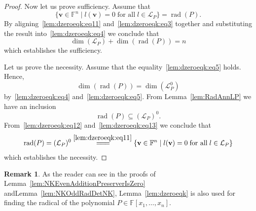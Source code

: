 \documentclass{elsarticle}
\DeclareMathOperator{\rad}{rad}
\def\F{{\mathbb F}}
\theoremstyle{definition}
\newtheorem{remark}[theorem]{Remark}
\numberwithin{equation}{section}
\begin{document}
\begin{proof}
Now let us prove sufficiency. Assume that 
\begin{equation}\label{lem:dzeroeqk:eq3}
\{\mathbf v \in \F^n \mid l(\mathbf v) = 0\;\mbox{for all} \;l \in \mathcal L_P\} = \rad(P). 
\end{equation}
By aligning~\eqref{lem:dzeroeqk:eq11} and~\eqref{lem:dzeroeqk:eq3} together and substituting the result into~\eqref{lem:dzeroeqk:eq4} we conclude that 
\begin{equation}\label{lem:dzeroeqk:eq5} 
\dim(\mathcal L_P) + \dim (\rad(P)) = n
\end{equation}
 which establishes the sufficiency.

Let us prove the necessity. Assume that the equality~\eqref{lem:dzeroeqk:eq5} holds. Hence, 
\begin{equation}\label{lem:dzeroeqk:eq12} 
\dim(\rad(P)) = \dim(\mathcal L_P^0)
\end{equation}
by~\eqref{lem:dzeroeqk:eq4} and~\eqref{lem:dzeroeqk:eq5}. From Lemma~\ref{lem:RadAnnLP} we have an inclusion
\begin{equation}\label{lem:dzeroeqk:eq13}
\rad(P) \subseteq (\mathcal L_P)^0.
\end{equation}
From~\eqref{lem:dzeroeqk:eq12} and~\eqref{lem:dzeroeqk:eq13} we conclude that 
$$\rad(P) = (\mathcal L_P)^0 \overset{\eqref{lem:dzeroeqk:eq11}}{=\joinrel=\joinrel=\joinrel} \{\mathbf v \in \F^n \mid l(\mathbf v) = 0\;\mbox{for all} \;l \in \mathcal L_P\}$$
which establishes the necessity.
\end{proof}

\begin{remark}\label{rem:LPUseful}As the reader can see in the proofs of Lemma~\ref{lem:NKEvenAdditionPreserverIsZero} and\linebreak Lemma~\ref{lem:NKOddRadDetNK}, Lemma~\ref{lem:dzeroeqk} is also used for finding the radical of the polynomial $P \in \F[x_1,\ldots, x_n]$. %
\end{remark}
\end{document}
